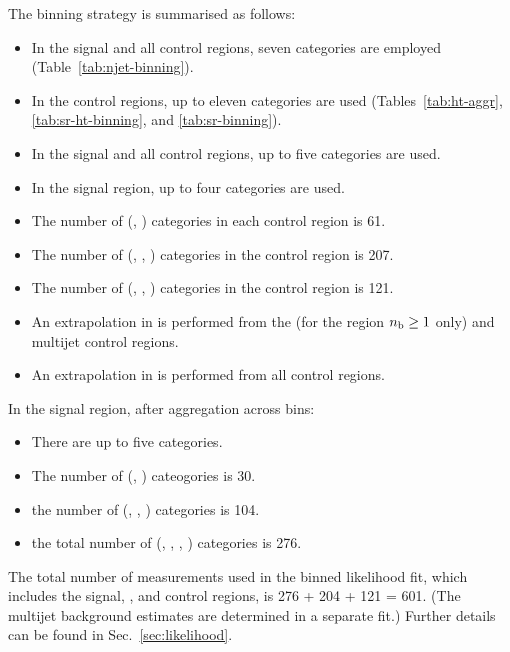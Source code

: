 The binning strategy is summarised as follows: 
\begin{itemize}
\item In the signal and all control regions, seven \njet categories
  are employed (Table~\ref{tab:njet-binning}). 
\item In the control regions, up to eleven \scalht categories are
  used (Tables~\ref{tab:ht-aggr}, \ref{tab:sr-ht-binning}, and
  \ref{tab:sr-binning}).  
\item In the signal and all control regions, up to five \nb categories
  are used.
\item In the signal region, up to four \HTmiss categories are used.
\item The number of (\njet, \scalht) categories in each control region
  is 61.
\item The number of (\njet, \scalht, \nb) categories in the \mj
  control region is 207.
\item The number of (\njet, \scalht, \nb) categories in the \mmj
  control region is 121.
\item An extrapolation in \nb is performed from the \mmj (for the
  region $n_{\text{b}} \geq 1$ only) and multijet control regions.
\item An extrapolation in \HTmiss is performed from all control regions.
\end{itemize}
In the signal region, after aggregation across \scalht bins: 
\begin{itemize}
\item There are up to five \scalht categories.
\item The number of (\njet, \scalht) cateogories is 30.
\item the number of (\njet, \scalht, \nb) categories is 104.
\item the total number of (\njet, \scalht, \nb, \HTmiss) categories is
  276. 
\end{itemize}

The total number of measurements used in the binned likelihood fit,
which includes the signal, \mj, and \mmj control regions, is 276 + 204
+ 121 = 601. (The multijet background estimates are determined in a
separate fit.) Further details can be found in
Sec.~\ref{sec:likelihood}.
